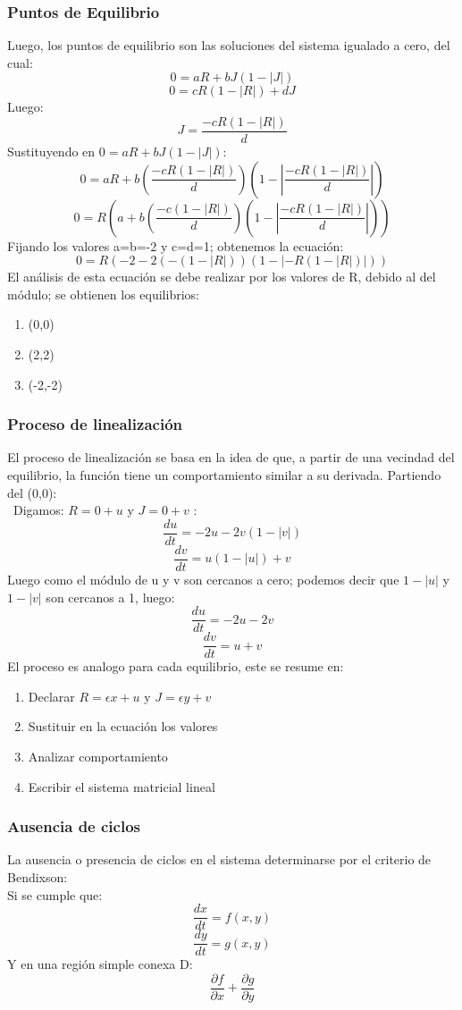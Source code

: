 \documentclass[a4paper, 10pt]{article}
\begin{document}
\subsubsection{Puntos de Equilibrio}
Luego, los puntos de equilibrio son las soluciones del sistema igualado a cero, 
del cual:
$$0=aR+bJ(1-|J|) $$
$$0=cR(1-|R|)+dJ$$
Luego:
$$J=\frac{-cR(1-|R|)}{d}$$
Sustituyendo en $0=aR+bJ(1-|J|)$:
$$0=aR+b(\frac{-cR(1-|R|)}{d})(1-|\frac{-cR(1-|R|)}{d}|) $$
$$0=R(a+b(\frac{-c(1-|R|)}{d})(1-|\frac{-cR(1-|R|)}{d}|) ) $$
Fijando los valores a=b=-2 y c=d=1; obtenemos la ecuación:
$$0=R(-2 -2(-(1-|R|))(1-|-R(1-|R|)|) ) $$
El análisis de esta ecuación se debe realizar por los valores de R, debido al 
del módulo; se obtienen los equilibrios:
\begin{enumerate}
  \item (0,0)
  \item (2,2)
  \item (-2,-2)
\end{enumerate}
\subsubsection{Proceso de linealización}
 El proceso de linealización se basa en la idea de que, a partir de una vecindad del equilibrio,
  la función tiene un comportamiento similar a su derivada. Partiendo del (0,0):
 \\ \ Digamos: $R=0+u$ y $J=0+v$ :
 $$\frac{du}{dt} = -2u - 2v(1 - |v|)$$
 $$\frac{dv}{dt} = u(1-|u|) + v$$
 Luego como el módulo de u y v son cercanos a cero; podemos decir que
 $1-|u|$ y $1-|v|$ son cercanos a 1, luego:
 $$\frac{du}{dt} = -2u - 2v$$
 $$\frac{dv}{dt} = u + v$$
 El proceso es analogo para cada equilibrio, este se resume en:
 \begin{enumerate}
  \item Declarar $R = \epsilon x +u$ y  $J = \epsilon y +v$
  \item Sustituir en la ecuación los valores
  \item Analizar comportamiento
  \item Escribir el sistema matricial lineal
 \end{enumerate}
 \subsubsection{Ausencia de ciclos}
 La ausencia o presencia de ciclos en el sistema determinarse por el criterio de Bendixson:
 \\ Si se cumple que:
 $$\frac{dx}{dt} =f(x,y) $$
 $$\frac{dy}{dt} =g(x,y) $$
 $$ $$
 Y en una región simple conexa D:
 $$ \frac{\partial f}{\partial x} + \frac{\partial g}{ \partial y}$$
 
\end{document}
